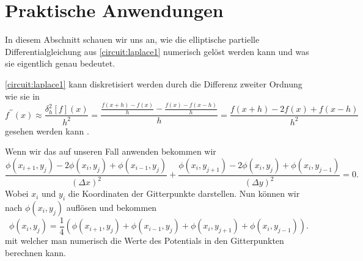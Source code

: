 \section{Praktische Anwendungen}
In diesem Abschnitt schauen wir uns an, wie die elliptische partielle Differentialgleichung aus \eqref{circuit:laplace1} numerisch gelöst werden kann und was sie eigentlich genau bedeutet.

\eqref{circuit:laplace1} kann diskretisiert werden durch die Differenz zweiter Ordnung wie sie in 
\begin{equation}
	f^{\prime \prime}(x) \approx \frac{\delta_h^2[f](x)}{h^2}=\frac{\frac{f(x+h)-f(x)}{h}-\frac{f(x)-f(x-h)}{h}}{h}=\frac{f(x+h)-2 f(x)+f(x-h)}{h^2}
	\label{circuit:second-order-central}
\end{equation}
gesehen werden kann \cite{enwiki:1220817436}.

Wenn wir das auf unseren Fall anwenden bekommen wir
\begin{equation}
	\frac{\phi(x_{i+1}, y_j) - 2\phi(x_i, y_j) + \phi(x_{i-1}, y_j)}{(\Delta x)^2} + \frac{\phi(x_i, y_{j+1}) - 2\phi(x_i, y_j) + \phi(x_i, y_{j-1})}{(\Delta y)^2} = 0.
	\label{circuit:discret_equation}
\end{equation}
Wobei $x_i$ und $y_i$ die Koordinaten der Gitterpunkte darstellen.
Nun können wir nach $\phi(x_i, y_j)$ auflösen und bekommen 
\begin{equation}
	\phi(x_i, y_j) = \frac{1}{4}(\phi(x_{i+1}, y_{j}) + \phi(x_{i-1}, y_{j}) + \phi(x_{i}, y_{j+1}) + \phi(x_{i}, y_{j-1})).
	\label{circuit:discret_equation2}
\end{equation}
mit welcher man numerisch die Werte des Potentials in den Gitterpunkten berechnen kann.
